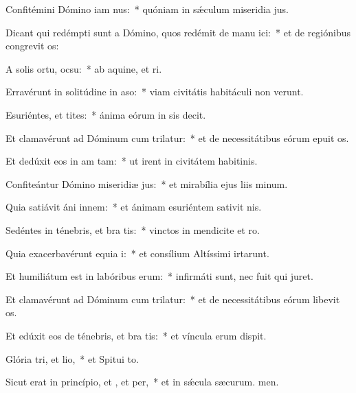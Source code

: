 \item Confitémini Dómino iam nus:~* quóniam in sǽculum miseridia jus.
\item Dicant qui redémpti sunt a Dómino, quos redémit de manu ici:~* et de regiónibus congrevit os:
\item A solis ortu,  ocsu:~* ab aquine, et ri.
\item Erravérunt in solitúdine in aso:~* viam civitátis habitáculi non verunt.
\item Esuriéntes, et tites:~* ánima eórum in sis decit.
\item Et clamavérunt ad Dóminum cum trilatur:~* et de necessitátibus eórum epuit os.
\item Et dedúxit eos in am tam:~* ut irent in civitátem habitinis.
\item Confiteántur Dómino miseridiæ jus:~* et mirabília ejus liis minum.
\item Quia satiávit áni innem:~* et ánimam esuriéntem sativit nis.
\item Sedéntes in ténebris, et bra tis:~* vinctos in mendicite et ro.
\item Quia exacerbavérunt equia i:~* et consílium Altíssimi irtarunt.
\item Et humiliátum est in labóribus  erum:~* infirmáti sunt, nec fuit qui juret.
\item Et clamavérunt ad Dóminum cum trilatur:~* et de necessitátibus eórum libevit os.
\item Et edúxit eos de ténebris, et bra tis:~* et víncula erum dispit.
\item Glória tri, et lio,~* et Spitui to.
\item Sicut erat in princípio, et , et per,~* et in sǽcula sæcurum. men.
